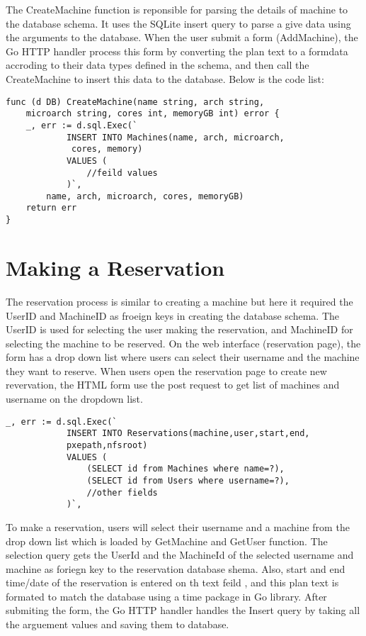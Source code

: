 The CreateMachine function is reponsible for parsing the details of machine to the database schema. It uses the SQLite insert query to parse a give data using the arguments to the database. When the user submit a form (AddMachine), the Go HTTP handler process this form by converting the plan text to a formdata accroding to their data types defined in the schema, and then call the CreateMachine to insert this data to the database. Below is the code list:
\begin{lstlisting}[caption=Adding machines details, label=Adding machine]
func (d DB) CreateMachine(name string, arch string,
	microarch string, cores int, memoryGB int) error {
	_, err := d.sql.Exec(`
			INSERT INTO Machines(name, arch, microarch,
			 cores, memory)
			VALUES (
				//feild values
			)`,
		name, arch, microarch, cores, memoryGB)
	return err
}
\end{lstlisting}

\section*{Making a Reservation}
The reservation process is similar to creating a machine but here it required the UserID and MachineID as froeign keys in creating the database schema. The UserID is used for selecting  the user making the reservation, and MachineID for selecting the machine to be reserved. On the web interface (reservation page), the form has a drop down list where users can select their username and the machine they want to reserve. When users open the reservation page to create new revervation, the HTML form use the post request to get list of machines and username on the dropdown list.
\begin{lstlisting}[caption=Storing Reservation details, label=Adding reservation]
	_, err := d.sql.Exec(`
			INSERT INTO Reservations(machine,user,start,end,
			pxepath,nfsroot)
			VALUES (
				(SELECT id from Machines where name=?),
				(SELECT id from Users where username=?),
				//other fields
			)`,
\end{lstlisting}

To make a reservation, users will select their username and a machine from the drop down list which is loaded by GetMachine and GetUser function. The selection query gets the UserId and the MachineId of the selected username and machine as foriegn key to the reservation database shema. Also, start and end time/date of the reservation is entered on th text feild , and this plan text is formated to match the database using a time package in Go library. After submiting the form, the Go HTTP handler handles the Insert query by taking all the arguement values and saving them to database. 
